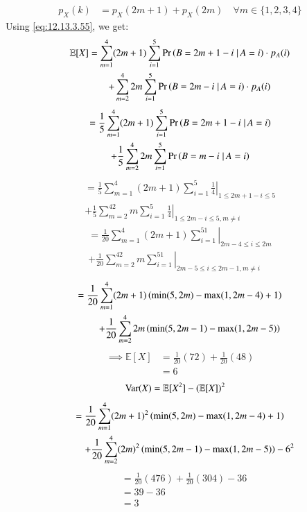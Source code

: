 \documentclass[journal,12pt,twocolumn]{IEEEtran}
\theoremstyle{remark}
\newcommand{\E}{\mathbb{E}}
\newcommand{\Var}{\mathrm{Var}}
\begin{document}
\begin{align}
	p_X(k) &= p_X(2m+1)+p_X(2m) \quad \forall m \in \{1,2,3,4\} \label{eq:12.13.3.55}
\end{align}
Using \eqref{eq:12.13.3.55}, we get:
\begin{multline}
	\E[X] = \sum_{m=1}^4(2m+1)\sum_{i=1}^5\pr{B=2m+1-i\left.\right |A=i}\cdot p_A(i)\\\qquad + \sum_{m=2}^42m\sum_{i=1}^5\pr{B=2m-i\left.\right |A=i}\cdot p_A(i)
\end{multline}
\begin{multline}
	= \frac{1}{5}\sum_{m=1}^4(2m+1)\sum_{i=1}^5\Pr\left(B=2m+1-i\left.\right |A=i\right)\\ + \frac{1}{5}\sum_{m=2}^42m\sum_{i=1}^5\Pr\left(B=m-i\left.\right |A=i\right)
\end{multline}
\begin{multline}
	= \frac{1}{5}\sum_{m=1}^4(2m+1)\sum_{i=1}^5\left.\frac{1}{4}\right |_{1\leq 2m+1-i\leq 5}\\ + \frac{1}{5}\sum_{m=2}^42m\sum_{i=1}^5\left.\frac{1}{4}\right |_{1\leq 2m-i\leq 5,m\neq i}
\end{multline}
\begin{multline}
	= \frac{1}{20}\sum_{m=1}^4(2m+1)\left.\sum_{i=1}^51\right |_{2m-4\leq i\leq 2m}\\ + \frac{1}{20}\sum_{m=2}^42m\left.\sum_{i=1}^51\right |_{2m-5\leq i\leq 2m-1,m\neq i}
\end{multline}
\begin{multline}
	= \frac{1}{20}\sum_{m=1}^4(2m+1)\left(\min(5,2m)-\max(1,2m-4)+1\right)\\ \qquad + \frac{1}{20}\sum_{m=2}^42m\left(\min(5,2m-1)-\max(1,2m-5)\right)
\end{multline}
\begin{align}
	\implies\E[X] &= \frac{1}{20}(72) + \frac{1}{20}(48)\\
	&= 6
\end{align}
\begin{align}
	\Var(X) &= \E[X^2] - \brak{\E[X]}^2
\end{align}
\begin{multline}
	= \frac{1}{20}\sum_{m=1}^4(2m+1)^2\left(\min(5,2m)-\max(1,2m-4)+1\right)\\ \qquad + \frac{1}{20}\sum_{m=2}^4(2m)^2\left(\min(5,2m-1)-\max(1,2m-5)\right) - 6^2
\end{multline}
\begin{align}
	&= \frac{1}{20}(476)+\frac{1}{20}(304) - 36\\
	&= 39-36\\
	&= 3
\end{align}
\end{document}

